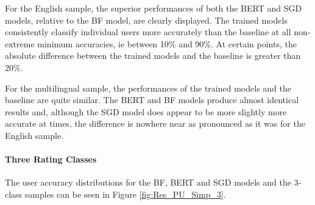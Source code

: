 For the English sample, the superior performances of both the BERT and SGD models, relative to the BF model, are clearly displayed. The trained models consistently classify individual users more accurately than the baseline at all non-extreme minimum accuracies, ie between 10\% and 90\%. At certain points, the absolute difference between the trained models and the baseline is greater than 20\%.

For the multilingual sample, the performances of the trained models and the baseline are quite similar. The BERT and BF models produce almost identical results and, although the SGD model does appear to be more slightly more accurate at times, the difference is nowhere near as pronounced as it was for the English sample.

\paragraph{Three Rating Classes}

The user accuracy distributions for the BF, BERT and SGD models and the 3-class samples can be seen in Figure \ref{fig:Res_PU_Simp_3}.

